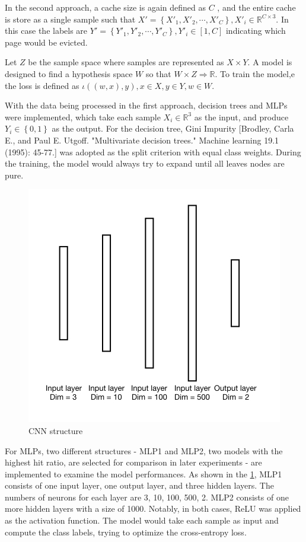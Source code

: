 \documentclass[letterpaper,twocolumn,10pt]{article}
\begin{document}
In the second approach, a cache size is again defined as $C$ , and the entire cache is store as a single sample such that ${X}' = \left \{ {{X}'}_1, {{X}'}_2, \cdots, {{X}'}_C \right \}, {{X}'}_i \in \mathbb{R}^{C\times 3}$. In this case the labels are ${Y}' = \left \{{Y}'_1, {Y}'_2, \cdots, {Y}'_C\right\}, {Y}'_i \in [1,C]$ indicating which page would be evicted.

Let $Z$ be the sample space where samples are represented as $X\times Y$. A model is designed to find a hypothesis space $W$ so that $W\times Z \Rightarrow \mathbb{R}$. To train the model,e the loss is defined as $\iota\left ( (w,x),y \right ), x\in X, y \in Y, w \in W$.

With the data being processed in the first approach, decision trees and MLPs were implemented, which take each sample $X_i \in \mathbb{R}^{3}$ as the input, and produce $Y_i \in \left\{0,1\right\}$ as the output. For the decision tree, Gini Impurity [Brodley, Carla E., and Paul E. Utgoff. "Multivariate decision trees." Machine learning 19.1 (1995): 45-77.] was adopted as the split criterion with equal class weights. During the training, the model would always try to expand until all leaves nodes are pure. 
\begin{figure}[!ht]
	\centering 
	\includegraphics[width=0.38\textheight]{proj_graphs/NN_str/NN_str001.jpg}
	\caption{CNN structure}
	\label{fig:mlp_design}
\end{figure}
For MLPs, two different structures - MLP1 and MLP2, two models with the highest hit ratio, are selected for comparison in later experiments - are implemented to examine the model performances. As shown in the \ref{fig:mlp_design}, MLP1 consists of one input layer, one output layer, and three hidden layers. The numbers of neurons for each layer are 3, 10, 100, 500, 2. MLP2 consists of one more hidden layers with a size of 1000. Notably, in both cases, ReLU was applied as the activation function. The model would take each sample as input and compute the class labels, trying to optimize the cross-entropy loss.
\end{document}
